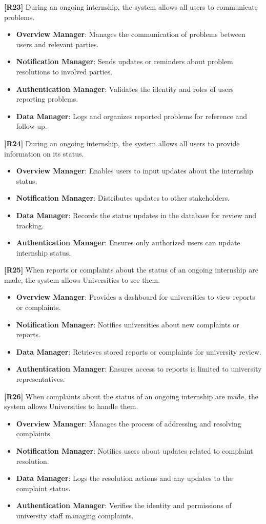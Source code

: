 \textbf{[R23]} During an ongoing internship, the system allows all users to communicate problems.
\begin{itemize}
    \item \textbf{Overview Manager}: Manages the communication of problems between users and relevant parties.
    \item \textbf{Notification Manager}: Sends updates or reminders about problem resolutions to involved parties.
    \item \textbf{Authentication Manager}: Validates the identity and roles of users reporting problems.
    \item \textbf{Data Manager}: Logs and organizes reported problems for reference and follow-up.
\end{itemize}

\textbf{[R24]} During an ongoing internship, the system allows all users to provide information on its status.
\begin{itemize}
    \item \textbf{Overview Manager}: Enables users to input updates about the internship status.
    \item \textbf{Notification Manager}: Distributes updates to other stakeholders.
    \item \textbf{Data Manager}: Records the status updates in the database for review and tracking.
    \item \textbf{Authentication Manager}: Ensures only authorized users can update internship status.
\end{itemize}

\textbf{[R25]} When reports or complaints about the status of an ongoing internship are made, the system allows Universities to see them.
\begin{itemize}
    \item \textbf{Overview Manager}: Provides a dashboard for universities to view reports or complaints.
    \item \textbf{Notification Manager}: Notifies universities about new complaints or reports.
    \item \textbf{Data Manager}: Retrieves stored reports or complaints for university review.
    \item \textbf{Authentication Manager}: Ensures access to reports is limited to university representatives.
\end{itemize}

\textbf{[R26]} When complaints about the status of an ongoing internship are made, the system allows Universities to handle them.
\begin{itemize}
    \item \textbf{Overview Manager}: Manages the process of addressing and resolving complaints.
    \item \textbf{Notification Manager}: Notifies users about updates related to complaint resolution.
    \item \textbf{Data Manager}: Logs the resolution actions and any updates to the complaint status.
    \item \textbf{Authentication Manager}: Verifies the identity and permissions of university staff managing complaints.
\end{itemize}
